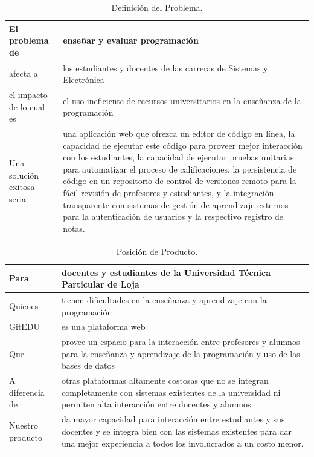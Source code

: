 \begin{table}[h!]
  \begin{tabular}{|p{}|p{}|}
    \hline
    El problema de & enseñar y evaluar programación \\
    \hline
    afecta a & los estudiantes y docentes de las carreras de Sistemas y Electrónica \\
    \hline
    el impacto de lo cual es & el uso ineficiente de recursos universitarios en la enseñanza de la programación \\
    \hline
    Una solución exitosa seria & una aplicación web que ofrezca un editor de código en línea, la capacidad de ejecutar este código para proveer mejor interacción con los estudiantes, la capacidad de ejecutar pruebas unitarias para automatizar el proceso de calificaciones, la persistencia de código en un repositorio de control de versiones remoto para la fácil revisión de profesores y estudiantes, y la integración transparente con sistemas de gestión de aprendizaje externos para la autenticación de usuarios y la respectivo registro de notas. \\
    \hline
  \end{tabular}
  \caption{Definición del Problema.}
  \label{def-prob}
\end{table}

\begin{table}[h!]
  \begin{tabular}{|p{}|p{}|}
    \hline
    Para & docentes y estudiantes de la Universidad Técnica Particular de Loja \\
    \hline
    Quienes & tienen dificultades en la enseñanza y aprendizaje con la programación \\
    \hline
    GitEDU & es una plataforma web \\
    \hline
    Que & provee un espacio para la interacción entre profesores y alumnos para la enseñanza y aprendizaje de la programación y uso de las bases de datos \\
    \hline
    A diferencia de & otras plataformas altamente costosas que no se integran completamente con sistemas existentes de la universidad ni permiten alta interacción entre docentes y alumnos \\
    \hline
    Nuestro producto & da mayor capacidad para interacción entre estudiantes y sus docentes y se integra bien con las sistemas existentes para dar una mejor experiencia a todos los involucrados a un costo menor. \\
    \hline
  \end{tabular}
  \caption{Posición de Producto.}
  \label{pos-prod}
\end{table}

